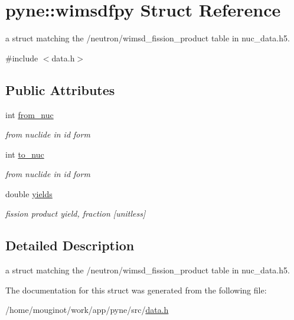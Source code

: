 \hypertarget{structpyne_1_1wimsdfpy}{}\section{pyne\+:\+:wimsdfpy Struct Reference}
\label{structpyne_1_1wimsdfpy}


a struct matching the \textquotesingle{}/neutron/wimsd\+\_\+fission\+\_\+product\textquotesingle{} table in nuc\+\_\+data.\+h5.  




{\ttfamily \#include $<$data.\+h$>$}

\subsection*{Public Attributes}
\begin{DoxyCompactItemize}
\item 
\mbox{\label{structpyne_1_1wimsdfpy_a7521e458719ebb8ed23f4912ec4555f8}} 
int \hyperlink{structpyne_1_1wimsdfpy_a7521e458719ebb8ed23f4912ec4555f8}{from\+\_\+nuc}
\begin{DoxyCompactList}\small\item\em from nuclide in id form \end{DoxyCompactList}\item 
\mbox{\label{structpyne_1_1wimsdfpy_a2a0f913a64fb76c5c82e1212df7fbb6c}} 
int \hyperlink{structpyne_1_1wimsdfpy_a2a0f913a64fb76c5c82e1212df7fbb6c}{to\+\_\+nuc}
\begin{DoxyCompactList}\small\item\em from nuclide in id form \end{DoxyCompactList}\item 
\mbox{\label{structpyne_1_1wimsdfpy_a1c20eef7a02f2f62dba113cbf24d8bf2}} 
double \hyperlink{structpyne_1_1wimsdfpy_a1c20eef7a02f2f62dba113cbf24d8bf2}{yields}
\begin{DoxyCompactList}\small\item\em fission product yield, fraction \mbox{[}unitless\mbox{]} \end{DoxyCompactList}\end{DoxyCompactItemize}


\subsection{Detailed Description}
a struct matching the \textquotesingle{}/neutron/wimsd\+\_\+fission\+\_\+product\textquotesingle{} table in nuc\+\_\+data.\+h5. 

The documentation for this struct was generated from the following file\+:\begin{DoxyCompactItemize}
\item 
/home/mouginot/work/app/pyne/src/\hyperlink{data_8h}{data.\+h}\end{DoxyCompactItemize}
